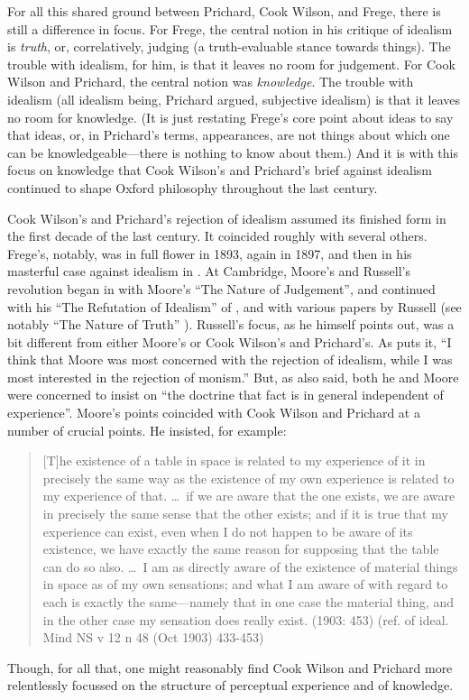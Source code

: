 For all this shared ground between Prichard, Cook Wilson, and Frege, there is still a difference in focus. For Frege, the central notion in his critique of idealism is \emph{truth}, or, correlatively, judging (a truth-evaluable stance towards things). The trouble with idealism, for him, is that it leaves no room for judgement. For Cook Wilson and Prichard, the central notion was \emph{knowledge}. The trouble with idealism (all idealism being, Prichard argued, subjective idealism) is that it leaves no room for knowledge. (It is just restating Frege's core point about ideas to say that ideas, or, in Prichard’s terms, appearances, are not things about which one can be knowledgeable---there is nothing to know about them.) And it is with this focus on knowledge that Cook Wilson's and Prichard's brief against idealism continued to shape Oxford philosophy throughout the last century.

Cook Wilson's and Prichard's rejection of idealism assumed its finished form in the first decade of the last century. It coincided roughly with several others. Frege's, notably, was in full flower in 1893, again in 1897, and then in his masterful case against idealism in \citeyear{Frege:1918lq}. At Cambridge, Moore’s and Russell's revolution began in \citeyear{Moore:1899sd} with Moore’s ``The Nature of Judgement'', and continued with his ``The Refutation of Idealism'' of \citeyear{Moore:1903uo}, and with various papers by Russell (see notably ``The Nature of Truth'' \citeyear{Russell:1906sm}). Russell's focus, as he himself points out, was a bit different from either Moore's or Cook Wilson's and Prichard's. As \citet[42]{Russell:1959fv} puts it, ``I think that Moore was most concerned with the rejection of idealism, while I was most interested in the rejection of monism.'' But, as \citet[42]{Russell:1959fv} also said, both he and Moore were concerned to insist on ``the doctrine that fact is in general independent of experience''. Moore's points coincided with Cook Wilson and Prichard at a number of crucial points. He insisted, for example:
\begin{quote}
	[T]he existence of a table in space is related to my experience of it in precisely the same way as the existence of my own experience is related to my experience of that. \ldots\ if we are aware that the one exists, we are aware in precisely the same sense that the other exists; and if it is true that my experience can exist, even when I do not happen to be aware of its existence, we have exactly the same reason for supposing that the table can do so also. \ldots\ I am as directly aware of the existence of material things in space as of my own sensations; and what I am aware of with regard to each is exactly the same---namely that in one case the material thing, and in the other case my sensation does really exist. (1903: 453) (ref. of ideal. Mind NS v 12 n 48 (Oct 1903) 433-453)
\end{quote}
Though, for all that, one might reasonably find Cook Wilson and Prichard more relentlessly focussed on the structure of perceptual experience and of knowledge.

